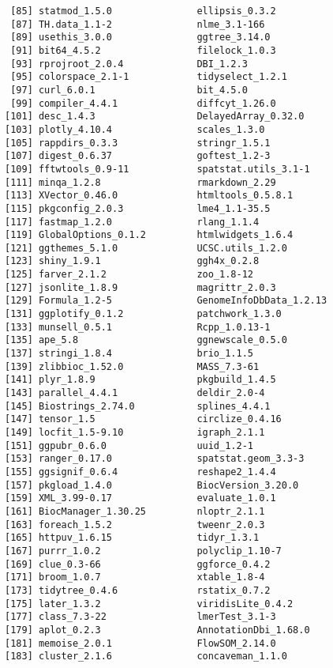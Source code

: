 \documentclass[
  letterpaper,
  DIV=11,
  numbers=noendperiod]{scrreprt}
\begin{document}
\begin{verbatim}
 [85] statmod_1.5.0               ellipsis_0.3.2             
 [87] TH.data_1.1-2               nlme_3.1-166               
 [89] usethis_3.0.0               ggtree_3.14.0              
 [91] bit64_4.5.2                 filelock_1.0.3             
 [93] rprojroot_2.0.4             DBI_1.2.3                  
 [95] colorspace_2.1-1            tidyselect_1.2.1           
 [97] curl_6.0.1                  bit_4.5.0                  
 [99] compiler_4.4.1              diffcyt_1.26.0             
[101] desc_1.4.3                  DelayedArray_0.32.0        
[103] plotly_4.10.4               scales_1.3.0               
[105] rappdirs_0.3.3              stringr_1.5.1              
[107] digest_0.6.37               goftest_1.2-3              
[109] fftwtools_0.9-11            spatstat.utils_3.1-1       
[111] minqa_1.2.8                 rmarkdown_2.29             
[113] XVector_0.46.0              htmltools_0.5.8.1          
[115] pkgconfig_2.0.3             lme4_1.1-35.5              
[117] fastmap_1.2.0               rlang_1.1.4                
[119] GlobalOptions_0.1.2         htmlwidgets_1.6.4          
[121] ggthemes_5.1.0              UCSC.utils_1.2.0           
[123] shiny_1.9.1                 ggh4x_0.2.8                
[125] farver_2.1.2                zoo_1.8-12                 
[127] jsonlite_1.8.9              magrittr_2.0.3             
[129] Formula_1.2-5               GenomeInfoDbData_1.2.13    
[131] ggplotify_0.1.2             patchwork_1.3.0            
[133] munsell_0.5.1               Rcpp_1.0.13-1              
[135] ape_5.8                     ggnewscale_0.5.0           
[137] stringi_1.8.4               brio_1.1.5                 
[139] zlibbioc_1.52.0             MASS_7.3-61                
[141] plyr_1.8.9                  pkgbuild_1.4.5             
[143] parallel_4.4.1              deldir_2.0-4               
[145] Biostrings_2.74.0           splines_4.4.1              
[147] tensor_1.5                  circlize_0.4.16            
[149] locfit_1.5-9.10             igraph_2.1.1               
[151] ggpubr_0.6.0                uuid_1.2-1                 
[153] ranger_0.17.0               spatstat.geom_3.3-3        
[155] ggsignif_0.6.4              reshape2_1.4.4             
[157] pkgload_1.4.0               BiocVersion_3.20.0         
[159] XML_3.99-0.17               evaluate_1.0.1             
[161] BiocManager_1.30.25         nloptr_2.1.1               
[163] foreach_1.5.2               tweenr_2.0.3               
[165] httpuv_1.6.15               tidyr_1.3.1                
[167] purrr_1.0.2                 polyclip_1.10-7            
[169] clue_0.3-66                 ggforce_0.4.2              
[171] broom_1.0.7                 xtable_1.8-4               
[173] tidytree_0.4.6              rstatix_0.7.2              
[175] later_1.3.2                 viridisLite_0.4.2          
[177] class_7.3-22                lmerTest_3.1-3             
[179] aplot_0.2.3                 AnnotationDbi_1.68.0       
[181] memoise_2.0.1               FlowSOM_2.14.0             
[183] cluster_2.1.6               concaveman_1.1.0           
\end{verbatim}
\end{document}
